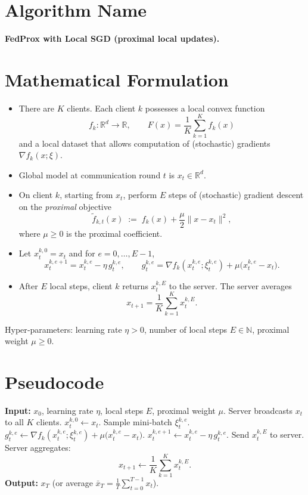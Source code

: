 \documentclass[11pt]{article}
\newcommand{\R}{\mathbb{R}}
\begin{document}
\section*{Algorithm Name}
\textbf{FedProx with Local SGD (proximal local updates).}

\section*{Mathematical Formulation}
\begin{itemize}
    \item There are $K$ clients.  Each client $k$ possesses a local convex function
    \[
        f_k : \R^d \to \R ,\qquad 
        F(x)=\frac1K\sum_{k=1}^{K} f_k(x)
    \]
    and a local dataset that allows computation of (stochastic) gradients $\nabla f_k(x;\xi)$.
    \item Global model at communication round $t$ is $x_t\in\R^d$.
    \item On client $k$, starting from $x_t$, perform $E$ steps of (stochastic) gradient descent on the \emph{proximal} objective
    \[
        \tilde f_{k,t}(x)\;:=\; f_k(x) + \frac{\mu}{2}\|x-x_t\|^{2},
    \]
    where $\mu\ge 0$ is the proximal coefficient.
    \item Let $x_{t}^{k,0}=x_t$ and for $e=0,\dots,E-1$,
    \[
        x_{t}^{k,e+1}=x_{t}^{k,e}-\eta\, g_{t}^{k,e},\qquad 
        g_{t}^{k,e}= \nabla f_k(x_{t}^{k,e};\xi_{t}^{k,e})+\mu\bigl(x_{t}^{k,e}-x_t\bigr).
    \tag{1}
    \]
    \item After $E$ local steps, client $k$ returns $x_{t}^{k,E}$ to the server.  The server averages
    \[
        x_{t+1}= \frac1K\sum_{k=1}^{K} x_{t}^{k,E}.
    \tag{2}
    \]
\end{itemize}
Hyper‑parameters: learning rate $\eta>0$, number of local steps $E\in\mathbb{N}$, proximal weight $\mu\ge0$.

\section*{Pseudocode}
\begin{algorithm}[H]
\caption{FedProx with Local SGD}
\begin{algorithmic}[1]
\STATE \textbf{Input:} $x_0$, learning rate $\eta$, local steps $E$, proximal weight $\mu$.
    \STATE Server broadcasts $x_t$ to all $K$ clients.
        \STATE $x_{t}^{k,0}\leftarrow x_t$.
            \STATE Sample mini‑batch $\xi_{t}^{k,e}$.
            \STATE $g_{t}^{k,e}\leftarrow \nabla f_k(x_{t}^{k,e};\xi_{t}^{k,e})+\mu\bigl(x_{t}^{k,e}-x_t\bigr)$.
            \STATE $x_{t}^{k,e+1}\leftarrow x_{t}^{k,e}-\eta\, g_{t}^{k,e}$.
        \ENDFOR
        \STATE Send $x_{t}^{k,E}$ to server.
    \ENDFOR
    \STATE Server aggregates:
    \[
        x_{t+1}\leftarrow \frac1K\sum_{k=1}^{K}x_{t}^{k,E}.
    \]
\ENDFOR
\STATE \textbf{Output:} $x_T$ (or average $\bar x_T=\frac1T\sum_{t=0}^{T-1}x_t$).
\end{algorithmic}
\end{algorithm}
\end{document}

